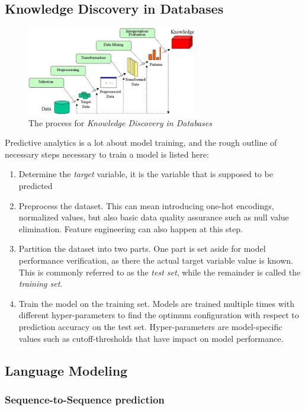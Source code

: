 \subsection{Knowledge Discovery in Databases}
\begin{figure}
	\centering
	\includegraphics[width=20em]{gfx/kdd_process}
	\caption{The process for \textit{Knowledge Discovery in Databases}}
	\label{fig:kdd_process}
\end{figure}
Predictive analytics is a lot about model training, and the rough outline of necessary steps necessary to train a model is listed here:
\begin{enumerate}
	\item Determine the \textit{target} variable, it is the variable that is supposed to be predicted
	\item Preprocess the dataset. This can mean introducing one-hot encodings, normalized values, but also basic data quality assurance such as null value elimination. Feature engineering can also happen at this step.
	\item Partition the dataset into two parts. One part is set aside for model performance verification, as there the actual target variable value is known. This is commonly referred to as the \textit{test set}, while the remainder is called the \textit{training set}.
	\item Train the model on the training set. Models are trained multiple times with different hyper-parameters to find the optimum configuration with respect to prediction accuracy on the test set. Hyper-parameters are model-specific values such as cutoff-thresholds that have impact on model performance.
\end{enumerate}

\subsection{Language Modeling}
\subsubsection{Sequence-to-Sequence prediction}

